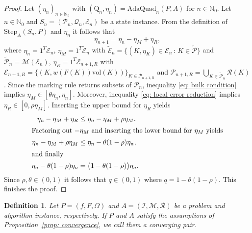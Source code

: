 \documentclass[a4paper, 11pt]{article}
\newtheorem{definition}[theorem]{Definition}
\newcommand{\vol}{\mathrm{vol}}
\begin{document}
	\begin{proof}
		Let $(\eta_n)_{n\in \mathbb{N}_0}$ with $(\mathrm{Q}_n, \eta_n)= \mathrm{AdaQuad}_n(P,A)$ for $n \in \mathbb{N}_0$. Let $n\in \mathbb{N}_0$ and $S_n=(\mathcal{P}_n, \mathcal{Q}_n, \mathcal{E}_n)$ be a state instance. From the definition of $\mathrm{Step}_A(S_n,P)$ and $\eta_n$ it follows that
		$$ \eta_{n+1} = \eta_n - \eta_{M} +  \eta_{R},$$
		where $\eta_n = 1^T \mathcal{E}_n$, $\eta_M = 1^T\widetilde{\mathcal{E}}_n$ with $\widetilde{\mathcal{E}}_n = \{(K, \eta_K)\in\mathcal{E}_n \, : \, K \in \widetilde{\mathcal{P}}\}$ and $\widetilde{\mathcal{P}}_n=\mathcal{M}(\mathcal{E}_n)$, $\eta_R = 1^T\mathcal{E}_{n+1,R}$ with $\mathcal{E}_{n+1,R} = \{(K, w(F(K))\vol(K))\}_{K \in \mathcal{P}_{n+1, R}}$ and $\mathcal{P}_{n+1, R} = \bigcup_{K \in \widetilde{\mathcal{P}}_n} \mathcal{R}(K)$. Since the marking rule returns subsets of $\mathcal{P}_n$, inequality \eqref{eq: bulk condition} implies $\eta_M \in [\theta \eta_n, \eta_n]$. Moreover, inequality \eqref{eq: local error reduction} implies $\eta_R \in [0,\rho \eta_M]$. Inserting the upper bound for $\eta_{R}$ yields
		\begin{align*}
			\eta_{n} - \eta_{M} + \eta_{R}  &\leq \eta_n  - \eta_{M} +\rho\eta_{M}.\\
			\intertext{Factoring out $-\eta_{M}$ and inserting the lower bound for $\eta_{M}$ yields}
			\eta_n  - \eta_{M} +\rho\eta_{M} &\leq \eta_n - \theta(1-\rho)\eta_n, \\
			\intertext{and finally}
			\eta_n - \theta(1-\rho)\eta_n & = \big(1-\theta(1-\rho)\big)\eta_n.
		\end{align*}
		Since $\rho, \theta \in (0,1)$ it follows that $q \in (0,1)$ where $q=1- \theta(1-\rho)$. This finishes the proof.
	\end{proof}
	
	
	
	\begin{definition}
		Let $P=(f,F,\Omega)$ and $A=(\mathcal{I},\mathcal{M}, \mathcal{R})$ be a problem  and algorithm instance, respectively. If $P$ and $A$ satisfy the assumptions of Proposition~\ref{prop: convergence}, we call them a converging pair.
	\end{definition}
	
\end{document}
